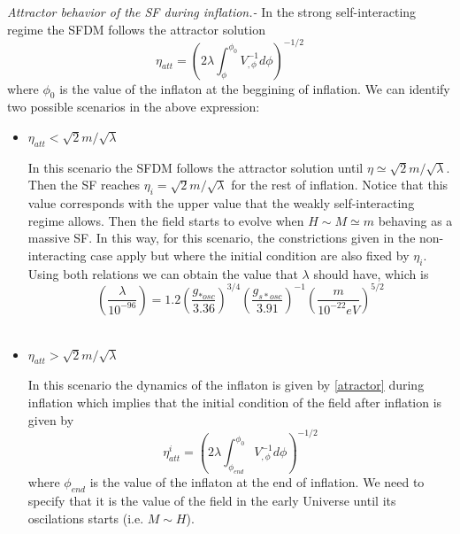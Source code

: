 \documentclass[amssymb,twocolumn,prd,nofootinbib,showpacs]{revtex4-1}
\begin{document}
\textit{Attractor behavior of the SF during inflation.-} In the strong self-interacting regime the SFDM follows the attractor solution \cite{curvatonatractor}
\begin{equation}\label{atractor}
\eta_{att} =\left(2\lambda\int_{\phi}^{\phi_0}V^{-1}_{,\phi}d\phi\right)^{-1/2}
\end{equation}
where $\phi_0$ is the value of the inflaton at the beggining of inflation. We can identify two possible scenarios in the above expression:
\begin{itemize}
\item $\eta_{att}<\sqrt{2}m/\sqrt{\lambda}$

In this scenario the SFDM follows the attractor solution until $\eta\simeq \sqrt{2}m/\sqrt{\lambda}$. Then the SF reaches $\eta_i=\sqrt{2}m/\sqrt{\lambda}$ for the rest of inflation. Notice that this value corresponds with the upper value that the weakly self-interacting regime allows. Then the field starts to evolve when $H\sim M\simeq m$ behaving as a massive SF. In this way, for this scenario, the constrictions given in the non-interacting case apply but where the initial condition are also fixed by $\eta_i$. Using both relations we can obtain the value that $\lambda$ should have, which is
\begin{equation}
\left(\frac{\lambda}{10^{-96}}\right)=1.2\left(\frac{g_{*osc}}{3.36}\right)^{3/4}\left(\frac{g_{s*osc}}{3.91}\right)^{-1}\left(\frac{m}{10^{-22}eV}\right)^{5/2}
\end{equation}\\

\item $\eta_{att}>\sqrt{2}m/\sqrt{\lambda}$

In this scenario the dynamics of the inflaton is given by \eqref{atractor} during inflation which implies that the initial condition of the field after inflation is given by
\begin{equation}\label{atractor2}
\eta_{att}^i = \left(2\lambda\int_{\phi_{end}}^{\phi_0}V^{-1}_{,\phi}d\phi\right)^{-1/2}
\end{equation}
where $\phi_{end}$ is the value of the inflaton at the end of inflation. We need to specify that it is the value of the field in the early Universe until its oscilations starts (i.e. $M\sim H$).


\end{itemize}
\end{document}
